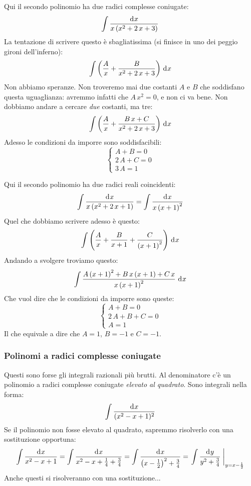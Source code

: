 \begin{exmp}
Qui il secondo polinomio ha due radici complesse coniugate:
\[
\int \frac{\diff x}{x \, (x^2 + 2 \, x + 3)}
\]
La tentazione di scrivere questo \`e sbagliatissima (si finisce in uno dei peggio gironi dell'inferno):
\[
\int \left( \frac{A}{x} + \frac{B}{x^2 + 2 \, x + 3} \right) \dx
\]
Non abbiamo speranze. Non troveremo mai due costanti $A$ e $B$ che soddisfano questa uguaglianza: avremmo infatti che $A \, x^2 = 0$, e non ci va bene. Non dobbiamo andare a cercare \emph{due} costanti, ma tre:
\[
\int \left( \frac{A}{x} + \frac{B \, x + C}{x^2 + 2 \, x + 3} \right) \dx
\]
Adesso le condizioni da imporre sono soddisfacibili:
\[
\begin{cases}
A + B = 0 \\
2 \, A + C = 0 \\
3 \, A = 1
\end{cases}
\]
\end{exmp}

\begin{exmp}
Qui il secondo polinomio ha due radici reali coincidenti:
\[
\int \frac{\diff x}{x \, (x^2 + 2 \, x + 1)} =
\int \frac{\diff x}{x \, {(x + 1)}^2}
\]
Quel che dobbiamo scrivere adesso \`e questo:
\[
\int \left( \frac{A}{x} + \frac{B}{x + 1} + \frac{C}{{(x+1)}^2} \right) \dx
\]
Andando a svolgere troviamo questo:
\[
\int \frac{A \, {(x + 1)}^2 + B \, x \, (x + 1) + C \, x}{x \, {(x + 1)}^2} \dx
\]
Che vuol dire che le condizioni da imporre sono queste:
\[
\begin{cases}
A + B = 0 \\
2 \, A + B + C = 0 \\
A = 1
\end{cases}
\]
Il che equivale a dire che $A = 1$, $B = -1$ e $C = - 1$.
\end{exmp}

\subsubsection{Polinomi a radici complesse coniugate}

Questi sono forse gli integrali razionali pi\`u brutti. Al denominatore c'\`e un polinomio a radici complesse coniugate \emph{elevato al quadrato}. Sono integrali nella forma:
\[
\int \frac{\diff x}{(x^2 - x + 1)^2}
\]
Se il polinomio non fosse elevato al quadrato, sapremmo risolverlo con una sostituzione opportuna:
\[
\int \frac{\diff x}{x^2 - x + 1} = 
\int \frac{\diff x}{x^2 - x + \frac{1}{4} + \frac{3}{4}} = 
\int \frac{\diff x}{{\left(x - \frac{1}{2}\right)}^2 + \frac{3}{4}} = 
\substitute{\int \frac{\diff y}{y^2 + \frac{3}{4}}}{y = x - \frac{1}{2}}
\]
Anche questi si risolveranno con una sostituzione...


